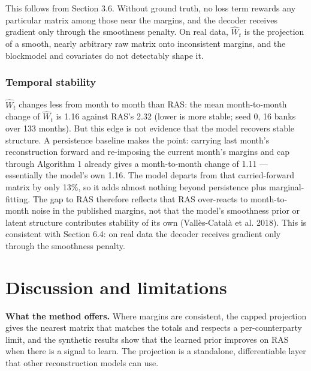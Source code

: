 \documentclass[
  a4paper,
]{article}
\begin{document}
This follows from Section 3.6. Without ground truth, no loss term
rewards any particular matrix among those near the margins, and the
decoder receives gradient only through the smoothness penalty. On real
data, \(\hat W_t\) is the projection of a smooth, nearly arbitrary raw
matrix onto inconsistent margins, and the blockmodel and covariates do
not detectably shape it.

\subsubsection*{Temporal stability}\label{temporal-stability}

\(\hat W_t\) changes less from month to month than RAS: the mean
month-to-month change of \(\hat W_t\) is 1.16 against RAS's 2.32 (lower
is more stable; seed 0, 16 banks over 133 months). But this edge is not
evidence that the model recovers stable structure. A persistence
baseline makes the point: carrying last month's reconstruction forward
and re-imposing the current month's margins and cap through Algorithm 1
already gives a month-to-month change of 1.11 --- essentially the
model's own 1.16. The model departs from that carried-forward matrix by
only 13\%, so it adds almost nothing beyond persistence plus
marginal-fitting. The gap to RAS therefore reflects that RAS over-reacts
to month-to-month noise in the published margins, not that the model's
smoothness prior or latent structure contributes stability of its own
(Vallès-Català et al. 2018). This is consistent with Section 6.4: on
real data the decoder receives gradient only through the smoothness
penalty.

\section{Discussion and limitations}\label{discussion-and-limitations}

\textbf{What the method offers.} Where margins are consistent, the
capped projection gives the nearest matrix that matches the totals and
respects a per-counterparty limit, and the synthetic results show that
the learned prior improves on RAS when there is a signal to learn. The
projection is a standalone, differentiable layer that other
reconstruction models can use.
\end{document}

